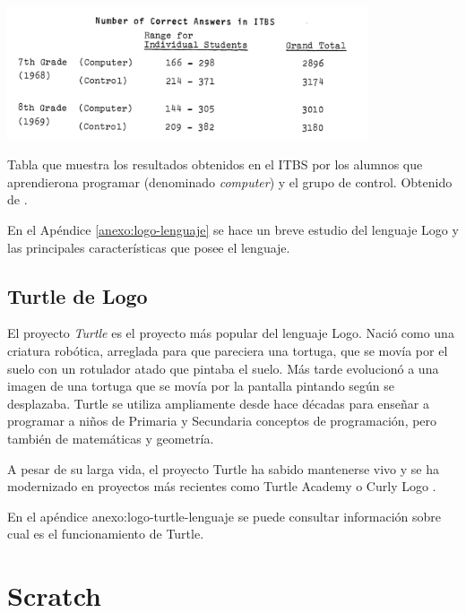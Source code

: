 {{\begin{table}[!ht]
	\begin{centering}
		\includegraphics[width=0.8\textwidth]{images/logo-itbs.png}
			\caption{Tabla que muestra los resultados obtenidos en el ITBS por los alumnos que aprendierona programar (denominado \emph{computer}) y el grupo de control. Obtenido de \cite[p.251]{feurzeig1969programming}.}
				\label{tab:logo-itbs}
	\end{centering}
\end{table}


En el Apéndice \ref{anexo:logo-lenguaje} se hace un breve estudio del lenguaje Logo y las principales características que posee el lenguaje.



\subsection{Turtle de Logo}
\label{sec:turtle}

El proyecto \emph{Turtle} es el proyecto más popular del lenguaje Logo. Nació como una criatura robótica, arreglada para que pareciera una tortuga, que se movía por el suelo con un rotulador atado que pintaba el suelo. Más tarde evolucionó a una imagen de una tortuga que se movía por la pantalla pintando según se desplazaba. Turtle se utiliza ampliamente desde hace décadas para enseñar a programar a niños de Primaria y Secundaria conceptos de programación, pero también de matemáticas y geometría\cite{abelson1980disessa,brown1995101}.

A pesar de su larga vida, el proyecto Turtle ha sabido mantenerse vivo y se ha modernizado en proyectos más recientes como Turtle Academy \cite{turtle-academy} o Curly Logo \cite{curly-logo}.

En el apéndice {anexo:logo-turtle-lenguaje} se puede consultar información sobre cual es el funcionamiento de Turtle.


\section{Scratch}
\label{sec:scratch}


}}
